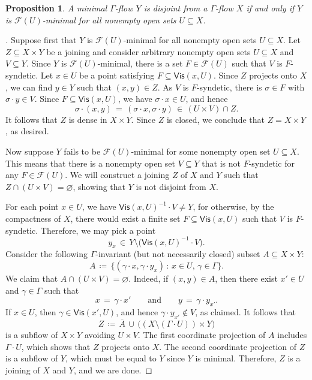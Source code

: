 \documentclass[11pt,reqno,psamsfonts]{amsart}
\theoremstyle{bfnote}
\newtheorem{prop}[theo]{Proposition}
\theoremstyle{definition}
\theoremstyle{remark}
\newcommand{\0}{\varnothing}
\newcommand{\set}[1]{\{#1\}}
\newcommand{\defeq}{\coloneqq}
\newcommand{\G}{\Gamma}
\newcommand{\Vis}{\mathsf{Vis}}
\numberwithin{equation}{section}
\newenvironment{scproof}[1][]{\begin{proof}[\textsc{\upshape{Proof}}#1]}{\end{proof}}
\begin{document}
    \begin{prop}\label{prop:characterize}
        A minimal $\G$-flow $Y$ is disjoint from a $\G$-flow $X$ if and only if $Y$ is $\mathcal{F}(U)$-minimal for all nonempty open sets $U \subseteq X$.
    \end{prop}
    \begin{scproof}
        Suppose first that $Y$ is $\mathcal{F}(U)$-minimal for all nonempty open sets $U \subseteq X$. Let $Z \subseteq X \times Y$ be a joining and consider arbitrary nonempty open sets $U \subseteq X$ and $V \subseteq Y$. Since $Y$ is $\mathcal{F}(U)$-minimal, there is a set $F \in \mathcal{F}(U)$ such that $V$ is $F$-syndetic. Let $x \in U$ be a point satisfying $F \subseteq \Vis(x,U)$. Since $Z$ projects onto $X$, we can find $y \in Y$ such that $(x,y) \in Z$. As $V$ is $F$-syndetic, there is $\sigma \in F$ with $\sigma \cdot y \in V$. Since $F \subseteq \Vis(x,U)$, we have $\sigma \cdot x \in U$, and hence
        \[
            \sigma \cdot (x,y) \,=\, (\sigma \cdot x, \sigma \cdot y) \,\in\, (U \times V) \cap Z.
        \]
        It follows that $Z$ is dense in $X \times Y$. Since $Z$ is closed, we conclude that $Z = X \times Y$, as desired.

        Now suppose $Y$ fails to be $\mathcal{F}(U)$-minimal for some nonempty open set $U \subseteq X$. This means that there is a nonempty open set $V \subseteq Y$ that is not $F$-syndetic for any $F \in \mathcal{F}(U)$. We will construct a joining $Z$ of $X$ and $Y$ such that $Z \cap (U \times V) = \0$, showing that $Y$ is not disjoint from $X$.

        For each point $x\in U$, we have $\Vis(x,U)^{-1} \cdot V \neq Y$, for otherwise, by the compactness of $X$, there would exist a finite set $F \subseteq \Vis(x,U)$ such that $V$ is $F$-syndetic. Therefore, we may pick a point \[y_x \,\in\, Y \setminus \big(\Vis(x,U)^{-1} \cdot V\big).\] Consider the following $\G$-invariant (but not necessarily closed) subset $A \subseteq X \times Y$:
        \[
            A \,\defeq\, \set{(\gamma \cdot x, \gamma \cdot y_x) \,:\, x \in U, \, \gamma \in \G}.
        \]
        We claim that $A \cap (U \times V) = \0$. Indeed, if $(x,y) \in A$, then there exist $x' \in U$ and $\gamma \in \G$ such that
        \[x \,=\, \gamma \cdot x' \qquad \text{and} \qquad y \,=\, \gamma \cdot y_{x'}.\] If $x \in U$, then  $\gamma \in \Vis(x', U)$, and hence $\gamma \cdot y_{x'} \notin V$, as claimed. It follows that
        \[
            Z \,\defeq\, \overline{A} \,\cup\, \big((X \setminus (\G \cdot U)) \times Y\big)
        \]
        is a subflow of $X \times Y$ avoiding $U \times V$. The first coordinate projection of $A$ includes $\G \cdot U$, which shows that $Z$ projects onto $X$. The second coordinate projection of $Z$ is a subflow of $Y$, which must be equal to $Y$ since $Y$ is minimal. Therefore, $Z$ is a joining of $X$ and $Y$, and we are done.
    \end{scproof}
\end{document}
